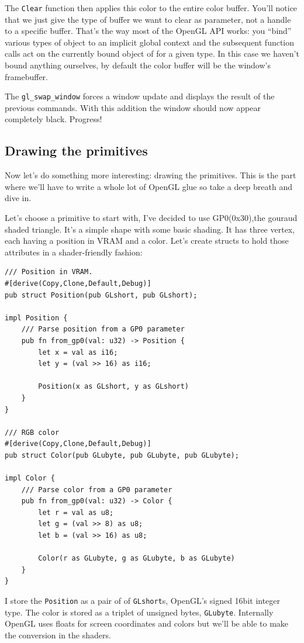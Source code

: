 \documentclass[a4paper]{article}
\newcommand{\code}[1] {\texttt{#1}}
\begin{document}
The \code{Clear} function then applies this color to the entire color
buffer. You'll notice that we just give the type of buffer we want to
clear as parameter, not a handle to a specific buffer. That's the way
most of the OpenGL API works: you ``bind'' various types of object to
an implicit global context and the subsequent function calls act on
the currently bound object of for a given type. In this case we
haven't bound anything ourselves, by default the color buffer will be
the window's framebuffer.

The \code{gl\_swap\_window} forces a window update and displays the
result of the previous commands. With this addition the window should
now appear completely black. Progress!

\subsection{Drawing the primitives}

Now let's do something more interesting: drawing the primitives. This
is the part where we'll have to write a whole lot of OpenGL glue so
take a deep breath and dive in.

Let's choose a primitive to start with, I've decided to use
GP0(0x30),the gouraud shaded triangle. It's a simple shape with some
basic shading. It has three vertex, each having a position in VRAM and
a color. Let's create structs to hold those attributes in a
shader-friendly fashion:

\begin{lstlisting}
/// Position in VRAM.
#[derive(Copy,Clone,Default,Debug)]
pub struct Position(pub GLshort, pub GLshort);

impl Position {
    /// Parse position from a GP0 parameter
    pub fn from_gp0(val: u32) -> Position {
        let x = val as i16;
        let y = (val >> 16) as i16;

        Position(x as GLshort, y as GLshort)
    }
}

/// RGB color
#[derive(Copy,Clone,Default,Debug)]
pub struct Color(pub GLubyte, pub GLubyte, pub GLubyte);

impl Color {
    /// Parse color from a GP0 parameter
    pub fn from_gp0(val: u32) -> Color {
        let r = val as u8;
        let g = (val >> 8) as u8;
        let b = (val >> 16) as u8;

        Color(r as GLubyte, g as GLubyte, b as GLubyte)
    }
}
\end{lstlisting}

I store the \code{Position} as a pair of of \code{GLshort}s, OpenGL's
signed 16bit integer type. The color is stored as a triplet of
unsigned bytes, \code{GLubyte}. Internally OpenGL uses floats for
screen coordinates and colors but we'll be able to make the conversion
in the shaders.
\end{document}

